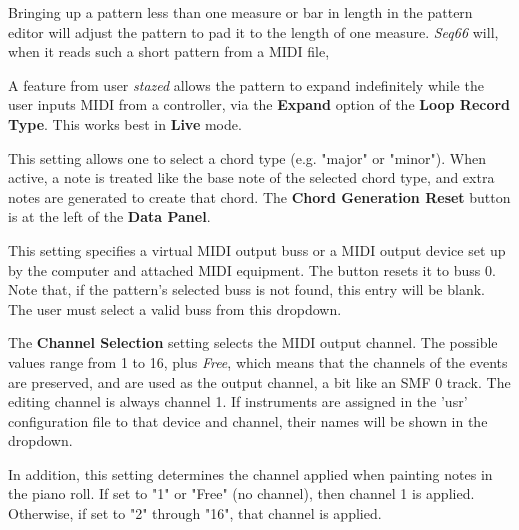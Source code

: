    Bringing up a pattern less than one measure or bar in
   length in the pattern editor will adjust the pattern to pad it to the
   length of one measure.
   \textsl{Seq66} will, when it reads such a short pattern
   from a MIDI file,

   A feature from user \textsl{stazed} allows the pattern to expand
   indefinitely while the user inputs MIDI from a controller, via the
   \textbf{Expand} option of the \textbf{Loop Record Type}.
   This works best in \textbf{Live} mode.


%

   This setting allows one to select a chord type (e.g. "major" or "minor").
   When active, a note is treated like the base note of the selected chord
   type, and extra notes are generated to create that chord.
   The \textbf{Chord Generation Reset} button is at the left of the
   \textbf{Data Panel}.


   This setting specifies a virtual MIDI output buss or a
   MIDI output device set up by the computer and
   attached MIDI equipment.
   The button resets it to buss 0.
   Note that, if the pattern's selected buss is not found, this entry will be
   blank.  The user must select a valid buss from this dropdown.

   The \textbf{Channel Selection} setting selects the MIDI output channel.
   The possible values range from 1 to 16, plus \textsl{Free}, which means
   that the channels of the events are preserved, and are used as the output
   channel, a bit like an SMF 0 track.
   The editing channel is always channel 1.
   If instruments are assigned in the 'usr' configuration file
   to that device and channel, their names will be shown in the dropdown.

   In addition, this setting determines the channel applied when painting notes
   in the piano roll.  If set to "1" or "Free" (no channel), then channel 1 is
   applied.  Otherwise, if set to "2" through "16", that channel is applied.

